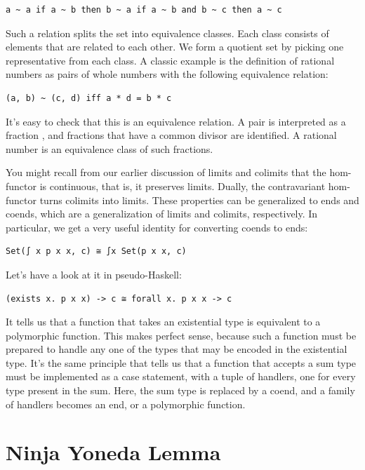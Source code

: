 \begin{verbatim}
a ~ a if a ~ b then b ~ a if a ~ b and b ~ c then a ~ c
\end{verbatim}

Such a relation splits the set into equivalence classes. Each class
consists of elements that are related to each other. We form a quotient
set by picking one representative from each class. A classic example is
the definition of rational numbers as pairs of whole numbers with the
following equivalence relation:

\begin{verbatim}
(a, b) ~ (c, d) iff a * d = b * c
\end{verbatim}

It's easy to check that this is an equivalence relation. A pair
 is interpreted as a fraction , and
fractions that have a common divisor are identified. A rational number
is an equivalence class of such fractions.

You might recall from our earlier discussion of limits and colimits that
the hom-functor is continuous, that is, it preserves limits. Dually, the
contravariant hom-functor turns colimits into limits. These properties
can be generalized to ends and coends, which are a generalization of
limits and colimits, respectively. In particular, we get a very useful
identity for converting coends to ends:

\begin{verbatim}
Set(∫ x p x x, c) ≅ ∫x Set(p x x, c)
\end{verbatim}

Let's have a look at it in pseudo-Haskell:

\begin{verbatim}
(exists x. p x x) -> c ≅ forall x. p x x -> c
\end{verbatim}

It tells us that a function that takes an existential type is equivalent
to a polymorphic function. This makes perfect sense, because such a
function must be prepared to handle any one of the types that may be
encoded in the existential type. It's the same principle that tells us
that a function that accepts a sum type must be implemented as a case
statement, with a tuple of handlers, one for every type present in the
sum. Here, the sum type is replaced by a coend, and a family of handlers
becomes an end, or a polymorphic function.

\section{Ninja Yoneda Lemma}\label{ninja-yoneda-lemma}


